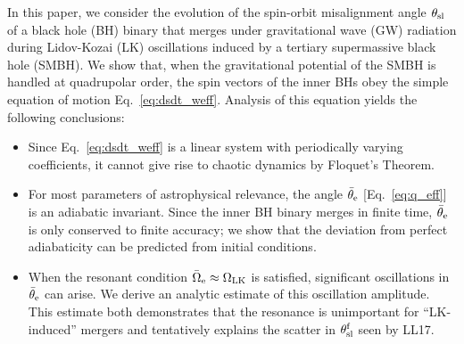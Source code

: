 \documentclass[
        twocolumn,
        twocolappendix
    ]{aastex63}
\begin{document}
In this paper, we consider the evolution of the spin-orbit misalignment angle
$\theta_{\rm sl}$ of a black hole (BH) binary that merges under gravitational
wave (GW) radiation during Lidov-Kozai (LK) oscillations induced by a tertiary
supermassive black hole (SMBH). We show that, when the gravitational potential
of the SMBH is handled at quadrupolar order, the spin vectors of the inner BHs
obey the simple equation of motion Eq.~\eqref{eq:dsdt_weff}. Analysis of this
equation yields the following conclusions:
\begin{itemize}
    \item Since Eq.~\eqref{eq:dsdt_weff} is a linear system with periodically
        varying coefficients, it cannot give rise to chaotic dynamics by
        Floquet's Theorem.

    \item For most parameters of astrophysical relevance, the angle
        $\bar{\theta}_{\rm e}$ [Eq.~\eqref{eq:q_eff}] is an adiabatic invariant.
        Since the inner BH binary merges in finite time, $\bar{\theta}_{\rm e}$
        is only conserved to finite accuracy; we show that the deviation from
        perfect adiabaticity can be predicted from initial conditions.

    \item When the resonant condition $\bar{\Omega}_{\rm e} \approx \Omega_{\rm
        LK}$ is satisfied, significant oscillations in $\bar{\theta}_{\rm e}$
        can arise. We derive an analytic estimate of this oscillation amplitude.
        This estimate both demonstrates that the resonance is unimportant for
        ``LK-induced'' mergers and tentatively explains the scatter in
        $\theta_{\rm sl}^{\rm f}$ seen by LL17.
\end{itemize}



\end{document}
